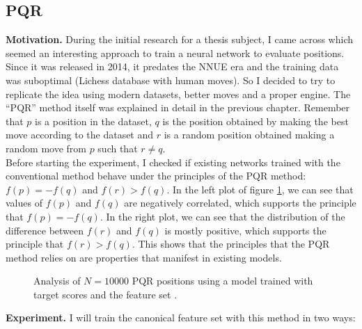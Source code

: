 \newpage
\subsection{PQR}

\textbf{Motivation.} During the initial research for a thesis subject, I came across \cite{dlchess:2014} which seemed an interesting approach to train a neural network to evaluate positions. Since it was released in 2014, it predates the NNUE era and the training data was suboptimal (Lichess database \cite{lichessdb} with human moves). So I decided to try to replicate the idea using modern datasets, better moves and a proper engine. The \enquote{PQR} method itself was explained in detail in the previous chapter.  Remember that $p$ is a position in the dataset, $q$ is the position obtained by making the best move according to the dataset and $r$ is a random position obtained making a random move from $p$ such that $r \neq q$. \\

Before starting the experiment, I checked if existing networks trained with the conventional method behave under the principles of the PQR method: ${f(p) = -f(q)}$ and ${f(r) > f(q)}$. In the left plot of figure \ref{pqr-eval}, we can see that values of $f(p)$ and $f(q)$ are negatively correlated, which supports the principle that $f(p)=-f(q)$. In the right plot, we can see that the distribution of the difference between $f(r)$ and $f(q)$ is mostly positive, which supports the principle that $f(r) > f(q)$. This shows that the principles that the PQR method relies on are properties that manifest in existing models.

\begin{figure}[H]
\centering
{}
\caption{Analysis of $N=10000$ PQR positions using a model trained with target scores and the feature set .}
\label{pqr-eval}
\end{figure}

\textbf{Experiment.} I will train the canonical  feature set with this method in two ways:


